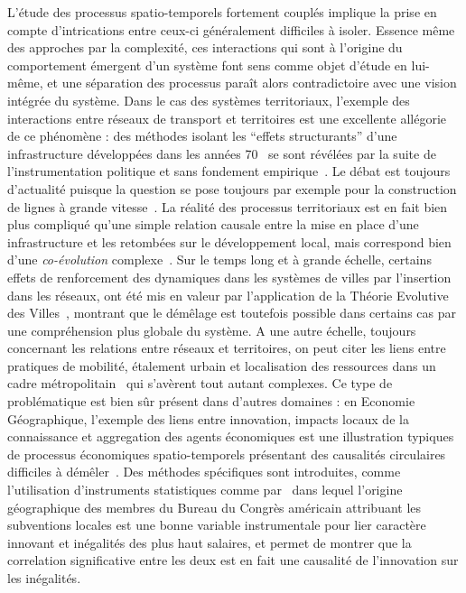 \bpar{
}
{
L'étude des processus spatio-temporels fortement couplés implique la prise en compte d'intrications entre ceux-ci généralement difficiles à isoler. Essence même des approches par la complexité, ces interactions qui sont à l'origine du comportement émergent d'un système font sens comme objet d'étude en lui-même, et une séparation des processus paraît alors contradictoire avec une vision intégrée du système. Dans le cas des systèmes territoriaux, l'exemple des interactions entre réseaux de transport et territoires est une excellente allégorie de ce phénomène : des méthodes isolant les ``effets structurants'' d'une infrastructure développées dans les années 70~\cite{bonnafous1974methodologies} se sont révélées par la suite de l'instrumentation politique et sans fondement empirique~\cite{offner1993effets}. Le débat est toujours d'actualité puisque la question se pose toujours par exemple pour la construction de lignes à grande vitesse~\cite{crozethalshs01094554}. La réalité des processus territoriaux est en fait bien plus compliqué qu'une simple relation causale entre la mise en place d'une infrastructure et les retombées sur le développement local, mais correspond bien d'une \emph{co-évolution} complexe~\cite{bretagnolletel00459720}. Sur le temps long et à grande échelle, certains effets de renforcement des dynamiques dans les systèmes de villes par l'insertion dans les réseaux, ont été mis en valeur par l'application de la Théorie Evolutive des Villes~\cite{espacegeo2014effets}, montrant que le démêlage est toutefois possible dans certains cas par une compréhension plus globale du système. A une autre échelle, toujours concernant les relations entre réseaux et territoires, on peut citer les liens entre pratiques de mobilité, étalement urbain et localisation des ressources dans un cadre métropolitain~\cite{cerqueira2017inegalites} qui s'avèrent tout autant complexes. Ce type de problématique est bien sûr présent dans d'autres domaines : en Economie Géographique, l'exemple des liens entre innovation, impacts locaux de la connaissance et aggregation des agents économiques est une illustration typiques de processus économiques spatio-temporels présentant des causalités circulaires difficiles à démêler~\cite{audretsch1996r}. Des méthodes spécifiques sont introduites, comme l'utilisation d'instruments statistiques comme par~\cite{aghion2015innovation} dans lequel l'origine géographique des membres du Bureau du Congrès américain attribuant les subventions locales est une bonne variable instrumentale pour lier caractère innovant et inégalités des plus haut salaires, et permet de montrer que la correlation significative entre les deux est en fait une causalité de l'innovation sur les inégalités.
}


